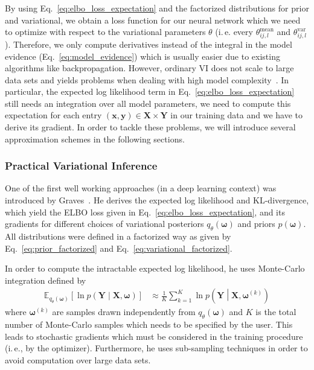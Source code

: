 \documentclass[runningheads]{llncs}
\begin{document}
By using Eq.~\ref{eq:elbo_loss_expectation} and the factorized distributions for prior and variational, we obtain a loss function for our neural network which we need to optimize with respect to the variational parameters $\theta$ (i.\,e. every $\theta^\mathrm{mean}_{ij,l}$ and $\theta^\mathrm{var}_{ij,l}$). 
Therefore, we only compute derivatives instead of the integral in the model evidence (Eq.~\ref{eq:model_evidence}) which is usually easier due to existing algorithms like backpropagation. 
However, ordinary VI does not scale to large data sets and yields problems when dealing with high model complexity~\cite{Gal2016Uncertainty}.
In particular, the expected log likelihood term in Eq.~\ref{eq:elbo_loss_expectation} still needs an integration over all model parameters, we need to compute this expectation for each entry $(\mathbf{x}, \mathbf{y}) \in \mathbf{X} \times \mathbf{Y}$ in our training data and we have to derive its gradient.
In order to tackle these problems, we will introduce several approximation schemes in the following sections.

\subsubsection{Practical Variational Inference}
\label{parctical_vi}
One of the first well working approaches (in a deep learning context) was introduced by Graves~\cite{Graves2011Practical}.
He derives the expected log likelihood and KL-divergence, which yield the ELBO loss given in Eq.~\ref{eq:elbo_loss_expectation}, and its gradients for different choices of variational posteriors $q_\theta(\boldsymbol{\omega})$ and priors $p(\boldsymbol{\omega})$.
All distributions were defined in a factorized way as given by Eq.~\ref{eq:prior_factorized} and Eq.~\ref{eq:variational_factorized}.

In order to compute the intractable expected log likelihood, he uses Monte-Carlo integration defined by
\begin{align}
    \mathbb{E}_{q_\theta(\boldsymbol{\omega})}\left[ \ln p \left(\mathbf{Y} \middle| \mathbf{X}, \boldsymbol{\omega}\right)\right] &\approx \frac{1}{K} \sum_{k=1}^K \ln p\left(\mathbf{Y} \middle| \mathbf{X, \boldsymbol{\omega}}^{(k)}\right)\label{eq:montecarlo_expectation}
\end{align}
where $\boldsymbol{\omega}^{(k)}$ are samples drawn independently from $q_\theta(\boldsymbol{\omega})$ and $K$ is the total number of Monte-Carlo samples which needs to be specified by the user.
This leads to stochastic gradients which must be considered in the training procedure (i.\,e., by the optimizer).
Furthermore, he uses sub-sampling techniques in order to avoid computation over large data sets.
\end{document}
